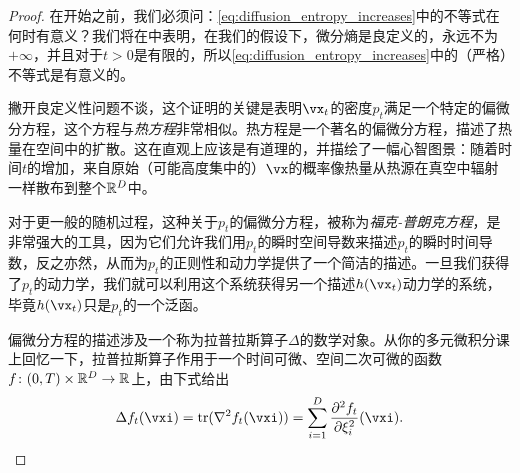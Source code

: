 \documentclass[../../book-main_zh.tex]{subfiles}
\begin{document}
\begin{proof}
    在开始之前，我们必须问：\eqref{eq:diffusion_entropy_increases}中的不等式在何时有意义？我们将在中表明，在我们的假设下，微分熵是良定义的，永远不为\(+\infty\)，并且对于\(t > 0\)是有限的，所以\eqref{eq:diffusion_entropy_increases}中的（严格）不等式是有意义的。

    撇开良定义性问题不谈，这个证明的关键是表明\(\vx_{t}\)的密度\(p_{t}\)满足一个特定的偏微分方程，这个方程与\textit{热方程}非常相似。热方程是一个著名的偏微分方程，描述了热量在空间中的扩散。这在直观上应该是有道理的，并描绘了一幅心智图景：随着时间\(t\)的增加，来自原始（可能高度集中的）\(\vx\)的概率像热量从热源在真空中辐射一样散布到整个\(\mathbb{R}^{D}\)中。
    
    对于更一般的随机过程，这种关于\(p_{t}\)的偏微分方程，被称为\textit{福克-普朗克方程}，是非常强大的工具，因为它们允许我们用\(p_{t}\)的瞬时空间导数来描述\(p_{t}\)的瞬时时间导数，反之亦然，从而为\(p_{t}\)的正则性和动力学提供了一个简洁的描述。一旦我们获得了\(p_{t}\)的动力学，我们就可以利用这个系统获得另一个描述\(h(\vx_{t})\)动力学的系统，毕竟\(h(\vx_{t})\)只是\(p_{t}\)的一个泛函。

    偏微分方程的描述涉及一个称为拉普拉斯算子\(\Delta\)的数学对象。从你的多元微积分课上回忆一下，拉普拉斯算子作用于一个时间可微、空间二次可微的函数\(f \colon (0, T) \times \mathbb{R}^{D} \to \mathbb{R}\)上，由下式给出
    \begin{equation}
        \Delta f_{t}(\vxi) = \tr(\nabla^{2}f_{t}(\vxi)) = \sum_{i = 1}^{D}\pddv{f_{t}}{\xi_{i}}(\vxi).
    \end{equation}
    

\end{proof}
\end{document}
